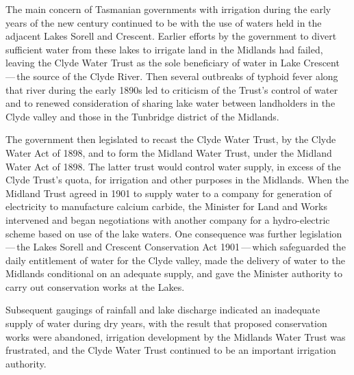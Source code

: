 The main concern of Tasmanian governments with irrigation during the
early years of the new century continued to be with the use of waters
held in the adjacent Lakes Sorell  and Crescent.
 Earlier efforts by the government to divert
sufficient water from these lakes to irrigate land in the Midlands had
failed, leaving the Clyde Water Trust as the sole beneficiary of water
in Lake Crescent\,---\,the source of the Clyde
River.  Then several outbreaks of typhoid fever
along that river during the early 1890s led to criticism of the
Trust's control of water and to renewed consideration of sharing lake
water between landholders in the Clyde valley and those in the
Tunbridge district of the Midlands.

The government then legislated to recast the Clyde Water Trust,
 by the
Clyde Water Act of 1898, and to form the Midland Water Trust, under
the Midland Water Act of 1898.  The latter trust would control water
supply, in excess of the Clyde Trust's quota, for irrigation and other
purposes in the Midlands.  When the Midland Trust agreed in 1901 to
supply water to a company for generation of electricity to manufacture
calcium carbide, the Minister for Land and Works intervened and began
negotiations with another company for a hydro-electric
 scheme based on
use of the lake waters.  One consequence was further
legislation\,---\,the Lakes Sorell and Crescent Conservation Act
1901\,---\,which safeguarded the daily entitlement of water for the
Clyde valley, made the delivery of water to the Midlands conditional
on an adequate supply, and gave the Minister authority to carry out
conservation works at the Lakes.

Subsequent gaugings of rainfall and lake discharge indicated an
inadequate supply of water during dry years, with the result that
proposed conservation works were abandoned, irrigation development by
the Midlands Water Trust  was frustrated,
and the Clyde Water Trust continued to be an important irrigation
authority.

